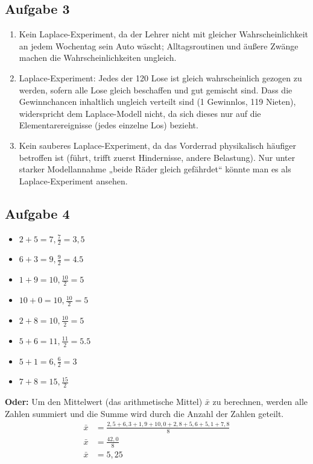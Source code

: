 \documentclass[11pt,a4paper,oneside]{article}
\begin{document}
	\begin{loesung}{}
		\subsection*{Aufgabe 3}
		\begin{enumerate}
			\item Kein Laplace-Experiment, da der Lehrer nicht mit gleicher Wahrscheinlichkeit an jedem Wochentag sein Auto wäscht; Alltagsroutinen und äußere Zwänge machen die Wahrscheinlichkeiten ungleich.
			\item Laplace-Experiment: Jedes der 120 Lose ist gleich wahrscheinlich gezogen zu werden, sofern alle Lose gleich beschaffen und gut gemischt sind. Dass die Gewinnchancen inhaltlich ungleich verteilt sind (1 Gewinnlos, 119 Nieten), widerspricht dem Laplace-Modell nicht, da sich dieses nur auf die Elementarereignisse (jedes einzelne Los) bezieht.
			\item Kein sauberes Laplace-Experiment, da das Vorderrad physikalisch häufiger betroffen ist (führt, trifft zuerst Hindernisse, andere Belastung). Nur unter starker Modellannahme „beide Räder gleich gefährdet“ könnte man es als Laplace-Experiment ansehen.
		\end{enumerate}
		\subsection*{Aufgabe 4}
		\begin{itemize}
			\item $2 + 5 = 7, \frac{7}{2} = 3,5$
			\item $6 + 3 = 9, \frac{9}{2} = 4.5$
			\item $1 + 9 = 10, \frac{10}{2} = 5$
			\item $10 + 0 = 10, \frac{10}{2} = 5$
			\item $2 + 8 = 10, \frac{10}{2} = 5$
			\item $5 + 6 = 11, \frac{11}{2} = 5.5$
			\item $5 + 1 = 6, \frac{6}{2} = 3$
			\item $7 + 8 = 15, \frac{15}{2}$
		\end{itemize}
		
		\textbf{Oder:} Um den Mittelwert (das arithmetische Mittel) $\bar{x}$ zu berechnen, werden alle Zahlen summiert und die Summe wird durch die Anzahl der Zahlen geteilt.
		\begin{align*}
			\bar{x} &= \frac{2,5 + 6,3 + 1,9 + 10,0 + 2,8 + 5,6 + 5,1 + 7,8}{8} \\
			\bar{x} &= \frac{42,0}{8} \\
			\bar{x} &= \boxed{5,25}
		\end{align*}
	\end{loesung}
	
\end{document}
